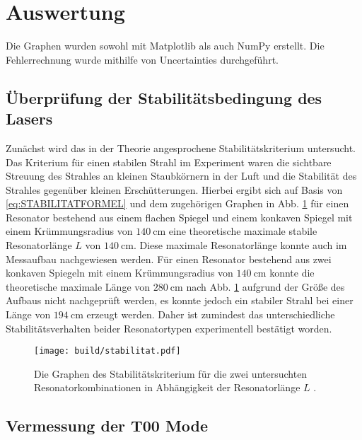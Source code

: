 \section{Auswertung}
\label{sec:Auswertung}
Die Graphen wurden sowohl mit Matplotlib \cite{matplotlib} als auch NumPy \cite{numpy} erstellt. Die
Fehlerrechnung wurde mithilfe von Uncertainties \cite{uncertainties} durchgeführt.

\subsection{Überprüfung der Stabilitätsbedingung des Lasers}
Zunächst wird das in der Theorie angesprochene Stabilitätskriterium untersucht. Das Kriterium für einen stabilen Strahl im Experiment waren die sichtbare Streuung des Strahles an kleinen Staubkörnern in der Luft und die Stabilität des Strahles gegenüber kleinen Erschütterungen.
Hierbei ergibt sich auf Basis von \ref{eq:STABILITATFORMEL} und dem zugehörigen Graphen in Abb. \ref{fig:stabilitat} für einen Resonator bestehend aus einem flachen Spiegel und einem konkaven Spiegel mit einem Krümmungsradius von $\SI{140}{\centi\meter}$ eine theoretische maximale stabile Resonatorlänge $L$ von $\SI{140}{\centi\meter}$. Diese maximale Resonatorlänge konnte auch im Messaufbau nachgewiesen werden. Für einen Resonator bestehend aus zwei konkaven Spiegeln mit einem Krümmungsradius von $\SI{140}{\centi\meter}$ konnte die theoretische maximale Länge von $\SI{280}{\centi\meter}$ nach Abb. \ref{fig:stabilitat} aufgrund der Größe des Aufbaus nicht nachgeprüft werden, es konnte jedoch ein stabiler Strahl bei einer Länge von $\SI{194}{\centi\meter}$ erzeugt werden. Daher ist zumindest das unterschiedliche Stabilitätsverhalten beider Resonatortypen experimentell bestätigt worden.



\begin{figure}
	\centering
	\texttt{[image: build/stabilitat.pdf]}
	\caption{Die Graphen des Stabilitätskriterium für die zwei untersuchten Resonatorkombinationen in Abhängigkeit der Resonatorlänge $L$ .}
	\label{fig:stabilitat}
\end{figure}




\subsection{Vermessung der T00 Mode}


